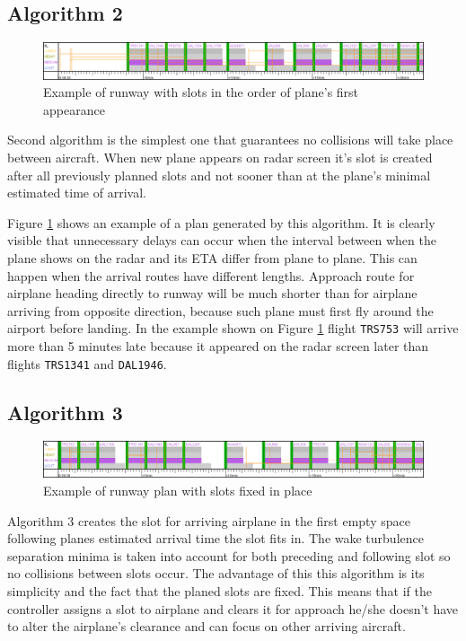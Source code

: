 \subsection{Algorithm 2}

\begin{figure}[h]
    \centering
    \includegraphics[width=\textwidth]{figures/rwy-end.png}
    \caption{Example of runway with slots in the order of plane's first appearance}
    \label{fig:rwy-end}
\end{figure}

Second algorithm is the simplest one that guarantees no collisions will take place between aircraft. When new plane appears on radar screen it's slot is created after all previously planned slots and not sooner than at the plane's minimal estimated time of arrival.

Figure \ref{fig:rwy-end} shows an example of a plan generated by this algorithm. It is clearly visible that unnecessary delays can occur when the interval between when the plane shows on the radar and its ETA differ from plane to plane. This can happen when the arrival routes have different lengths. Approach route for airplane heading directly to runway will be much shorter than for airplane arriving from opposite direction, because such plane must first fly around the airport before landing.  In the example shown on Figure \ref{fig:rwy-end} flight \texttt{TRS753} will arrive more than 5 minutes late because it appeared on the radar screen later than flights \texttt{TRS1341} and \texttt{DAL1946}.

\subsection{Algorithm 3}

\begin{figure}[h]
    \centering
    \includegraphics[width=\textwidth]{figures/rwy-fill-voids.png}
    \caption{Example of runway plan with slots fixed in place}
    \label{fig:rwy-fill-voids}
\end{figure}

Algorithm 3 creates the slot for arriving airplane in the first empty space following planes estimated arrival time the slot fits in. The wake turbulence separation minima is taken into account for both preceding and following slot so no collisions between slots occur. The advantage of this this algorithm is its simplicity and the fact that the planed slots are fixed. This means that if the controller assigns a slot to airplane and clears it for approach he/she doesn't have to alter the airplane's clearance and can focus on other arriving aircraft.

